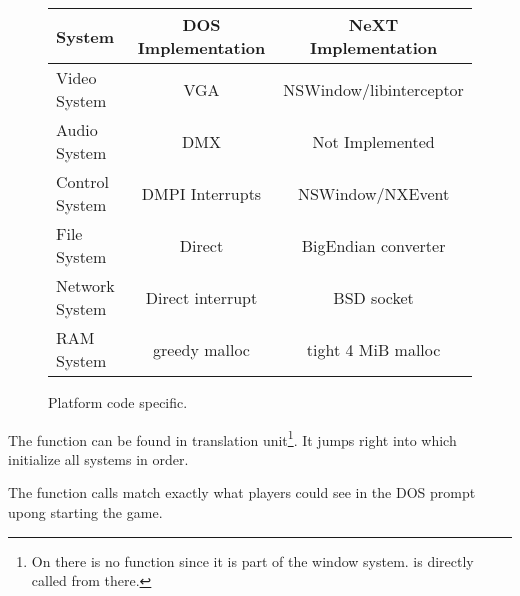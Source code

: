 \par
 \begin{figure}[H]
\centering  
\begin{tabularx}{\textwidth}{ L{0.22} | C{0.39} | C{0.39} }
  \toprule
  \textbf{System} & \textbf{DOS Implementation} & \textbf{NeXT Implementation}\\
  \toprule 
    Video System & VGA & NSWindow/libinterceptor\\
    Audio System & DMX & Not Implemented\\
    Control System & DMPI Interrupts & NSWindow/NXEvent \\
    File  System & Direct & BigEndian converter\\
    Network System & Direct interrupt & BSD socket \\
    RAM System & greedy malloc & tight 4 MiB malloc\\
   \toprule
\end{tabularx}
\caption{Platform code specific.}
\end{figure}

\par


The  function can be found in  translation unit\footnote{On \NeXT there is no  function since it is part of the window system.  is directly called from there.}. It jumps right into  which initialize all systems in order.\\
\par
{}
\pagebreak

The function calls match exactly what players could see in the DOS prompt upong starting the game.\\
\par
{}
\par
{}

